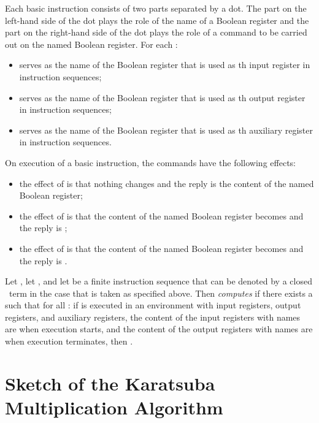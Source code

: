 \documentclass{llncs}
\begin{document}
Each basic instruction consists of two parts separated by a dot.
The part on the left-hand side of the dot plays the role of the name of 
a Boolean register and the part on the right-hand side of the dot plays 
the role of a command to be carried out on the named Boolean register.
For each :
\begin{itemize}
\item
 serves as the name of the Boolean register that is used as 
th input register in instruction sequences;
\item
 serves as the name of the Boolean register that is used as
th output register in instruction sequences;
\item
 serves as the name of the Boolean register that is used as 
th auxiliary register in instruction sequences.
\end{itemize}
On execution of a basic instruction, the commands have the following 
effects:
\begin{itemize}
\item
the effect of  is that nothing changes and the reply is the 
content of the named Boolean register;
\item
the effect of  is that the content of the named Boolean 
register becomes  and the reply is ;
\item
the effect of  is that the content of the named Boolean 
register becomes  and the reply is .
\end{itemize}

Let , let , and let
 be a finite instruction sequence that can be denoted by a closed 
\PGA\ term in the case that  is taken as specified above.
Then  \emph{computes}  if there exists a  such that 
for all : if  is executed in an environment 
with  input registers,  output registers, and  auxiliary 
registers, the content of the input registers with names 
 are  when execution starts, 
and the content of the output registers with names 
 are  when execution 
terminates, then .

\section{Sketch of the Karatsuba Multiplication Algorithm}
\label{sect-sketch-KMA}
\end{document}
